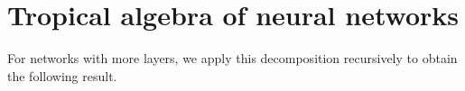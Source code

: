 \documentclass{article}
\theoremstyle{definition}
\newtheorem{comment}[theorem]{Comment}
\begin{document}
\newpage

\section{Tropical algebra of neural networks}\label{sec:trop_netw}

For networks with more layers, we apply this decomposition recursively to obtain the following result.
\end{document}
